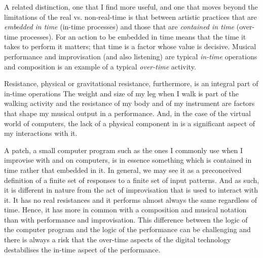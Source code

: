 \documentclass{article}
\begin{document}
A related distinction, one that I find more useful, and one that moves beyond the limitations of the real vs. non-real-time is that between artistic practices that are \emph{embedded in time} (in-time processes) and those that are \emph{contained in time} (over-time processes). 
For an action to be embedded in time means that the time it takes to perform it matters; that time is a factor whose value is decisive. Musical performance and improvisation (and also listening) are typical \emph{in-time} operations and composition is an example of a typical \emph{over-time} activity. 


Resistance, physical or gravitational resistance, furthermore, is an integral part of in-time operations %
The weight and size of my leg when I walk is part of the walking activity and the resistance of my body and of my instrument are factors that shape my musical output in a performance. And, in the case of  the virtual world of computers, the lack of a physical component in is a significant aspect of my interactions with it.

A patch, a small computer program such as the ones I commonly use when I improvise with and on computers, is in essence something which is contained in time rather that embedded in it. In general, we may see it as a preconceived definition of a finite set of responses to a finite set of input patterns. And as such, it is different in nature from the act of improvisation that is used to interact with it. It has no real resistances and it performs almost always the same regardless of time. Hence, it has more in common with a composition and musical notation than with performance and improvisation. This difference between the logic of the computer program and the logic of the performance can be challenging and there is always a risk that the over-time aspects of the digital technology destabilises the in-time aspect of the performance.
\end{document}

